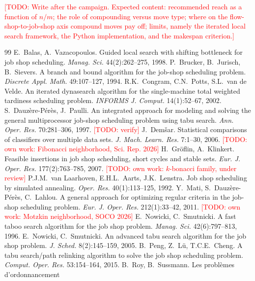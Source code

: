 \documentclass[10pt,twocolumn]{article}
\newcommand{\todo}[1]{\textcolor{red}{[TODO: #1]}}
\begin{document}
\todo{Write after the campaign. Expected content: recommended reach as a
function of $n/m$; the role of compounding versus move type; where on the
flow-shop-to-job-shop axis compound moves pay off; limits, namely the
iterated local search framework, the Python implementation, and the
makespan criterion.}

\begin{thebibliography}{99}\small
{} E.~Balas, A.~Vazacopoulos. Guided local search with
shifting bottleneck for job shop scheduling. \emph{Manag. Sci.}
44(2):262--275, 1998.
 P.~Brucker, B.~Jurisch, B.~Sievers. A branch and
bound algorithm for the job-shop scheduling problem. \emph{Discrete Appl.
Math.} 49:107--127, 1994.
 R.K.~Congram, C.N.~Potts, S.L.~van de Velde. An
iterated dynasearch algorithm for the single-machine total weighted
tardiness scheduling problem. \emph{INFORMS J. Comput.} 14(1):52--67,
2002.
 S.~Dauz\`ere-P\'er\`es, J.~Paulli. An integrated
approach for modeling and solving the general multiprocessor job-shop
scheduling problem using tabu search. \emph{Ann. Oper. Res.} 70:281--306,
1997. \todo{verify}
 J.~Dem\v{s}ar. Statistical comparisons of classifiers
over multiple data sets. \emph{J. Mach. Learn. Res.} 7:1--30, 2006.
 \todo{own work: Fibonacci neighborhood, Sci. Rep. 2026}
 H.~Gr\"oflin, A.~Klinkert. Feasible insertions in
job shop scheduling, short cycles and stable sets. \emph{Eur. J. Oper.
Res.} 177(2):763--785, 2007.
 \todo{own work: $k$-bonacci family, under review}
 P.J.M.~van Laarhoven, E.H.L.~Aarts, J.K.~Lenstra.
Job shop scheduling by simulated annealing. \emph{Oper. Res.}
40(1):113--125, 1992.
 Y.~Mati, S.~Dauz\`ere-P\'er\`es, C.~Lahlou. A general
approach for optimizing regular criteria in the job-shop scheduling
problem. \emph{Eur. J. Oper. Res.} 212(1):33--42, 2011.
 \todo{own work: Motzkin neighborhood, SOCO 2026}
 E.~Nowicki, C.~Smutnicki. A fast taboo search
algorithm for the job shop problem. \emph{Manag. Sci.} 42(6):797--813,
1996.
 E.~Nowicki, C.~Smutnicki. An advanced tabu search
algorithm for the job shop problem. \emph{J. Sched.} 8(2):145--159, 2005.
 B.~Peng, Z.~L\"u, T.C.E.~Cheng. A tabu search/path
relinking algorithm to solve the job shop scheduling problem.
\emph{Comput. Oper. Res.} 53:154--164, 2015.
 B.~Roy, B.~Sussmann. Les probl\`emes d'ordonnancement

\end{thebibliography}
\end{document}
